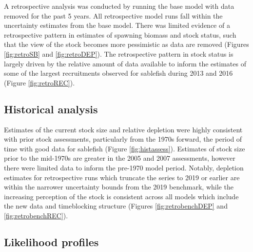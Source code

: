 \documentclass[11pt,
  english,
  a4paper,
]{article}
\begin{document}
\leavevmode\tagmcend\tagstructend


A retrospective analysis was conducted by running the base model with data removed for the past 5 years. All retrospective model runs fall within the uncertainty estimates from the base model. There was limited evidence of a retrospective pattern in estimates of spawning biomass and stock status, such that the view of the stock becomes more pessimistic as data are removed (Figures \ref{fig:retroSB} and \ref{fig:retroDEP}). The retrospective pattern in stock status is largely driven by the relative amount of data available to inform the estimates of some of the largest recruitments observed for sablefish during 2013 and 2016 (Figure \ref{fig:retroREC}).

\leavevmode\tagmcend\tagstructend\par


\hypertarget{historical-analysis}{%
\subsection{Historical analysis}\label{historical-analysis}}

\leavevmode\tagmcend\tagstructend


Estimates of the current stock size and relative depletion were highly consistent with prior stock assessments, particularly from the 1970s forward, the period of time with good data for sablefish (Figure \ref{fig:histassess}). Estimates of stock size prior to the mid-1970s are greater in the 2005 and 2007 assessments, however there were limited data to inform the pre-1970 model period. Notably, depletion estimates for retrospective runs which truncate the series to 2019 or earlier are within the narrower uncertainty bounds from the 2019 benchmark, while the increasing perception of the stock is consistent across all models which include the new data and timeblocking structure (Figures \ref{fig:retrobenchDEP} and \ref{fig:retrobenchREC}).

\leavevmode\tagmcend\tagstructend\par


\hypertarget{likelihood-profiles}{%
\subsection{Likelihood profiles}\label{likelihood-profiles}}
\end{document}
